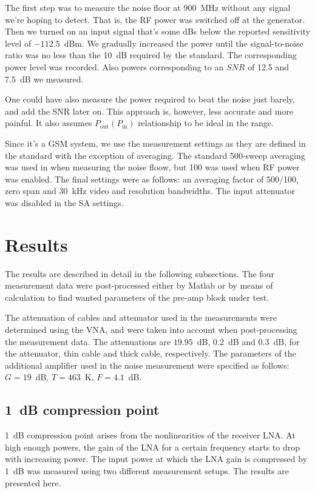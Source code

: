 \documentclass[a4paper, 12pt]{article}
\begin{document}
The first step was to measure the noise floor at 900~MHz without any signal 
we're hoping to detect. That is, the RF power was switched off at the generator. 
Then we turned on an input signal that's some dBs below the reported sensitivity 
level of $-112.5$~dBm. We gradually increased the power until the signal-to-noise 
ratio was no less than the 10~dB required by the standard. The corresponding power 
level was recorded. Also powers corresponding to an $\textit{SNR}$ of 12.5 and 7.5~dB 
we measured. 

One could have also measure the power required to beat the noise just barely, and 
add the SNR later on. This approach is, however, less accurate and more painful. It 
also assumes $P_\mathrm{out}(P_\mathrm{in})$ relationship to be ideal in the range.

Since it's a GSM system, we use the measurement settings as they are defined in 
the standard with the exception of averaging. The standard 500-sweep averaging was 
used in when measuring the noise floow, but 100 was used when RF power was enabled. 
The final settings were as follows: an averaging factor of 500/100, zero span and 
30~kHz video and resolution bandwidths. The input attenuator was disabled in the 
SA settings.


\newpage
\section{Results}

The results are described in detail in the following subsections. The four measurement 
data were post-processed either by Matlab or by means of calculation to find wanted 
parameters of the pre-amp block under test.

The attenuation of cables and attenuator used in the measurements were determined using 
the VNA, and were taken into account when post-processing the measurement data. The 
attenuations are $19.95$~dB, $0.2$~dB and $0.3$~dB, for the attenuator, thin cable and 
thick cable, respectively. The parameters of the additional amplifier used in the noise 
measurement were specified as follows: $G = 19$~dB, $T = 463$~K, $F = 4.1$~dB.


\subsection{1~dB compression point}

1~dB compression point arises from the nonlinearities of the receiver LNA. At high enough 
powers, the gain of the LNA for a certain frequency starts to drop with increasing power. 
The input power at which the LNA gain is compressed by 1~dB was measured using two different 
measurement setups. The results are presented here.
\end{document}
